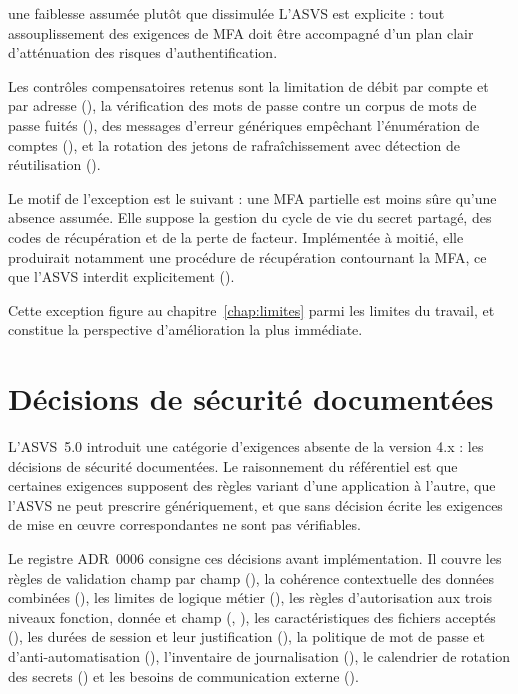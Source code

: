 \begin{constat}{une faiblesse assumée plutôt que dissimulée}
L'ASVS est explicite : tout assouplissement des exigences de MFA doit être
accompagné d'un plan clair d'atténuation des risques d'authentification.

Les contrôles compensatoires retenus sont la limitation de débit par compte et
par adresse (), la vérification des mots de passe contre un corpus
de mots de passe fuités (), des messages d'erreur génériques
empêchant l'énumération de comptes (), et la rotation des jetons de
rafraîchissement avec détection de réutilisation ().

Le motif de l'exception est le suivant : une MFA partielle est moins sûre qu'une
absence assumée. Elle suppose la gestion du cycle de vie du secret partagé, des
codes de récupération et de la perte de facteur. Implémentée à moitié, elle
produirait notamment une procédure de récupération contournant la MFA, ce que
l'ASVS interdit explicitement ().

Cette exception figure au chapitre~\ref{chap:limites} parmi les limites du
travail, et constitue la perspective d'amélioration la plus immédiate.
\end{constat}

\section{Décisions de sécurité documentées}

L'ASVS~5.0 introduit une catégorie d'exigences absente de la version 4.x : les
décisions de sécurité documentées. Le raisonnement du référentiel est que
certaines exigences supposent des règles variant d'une application à l'autre,
que l'ASVS ne peut prescrire génériquement, et que sans décision écrite les
exigences de mise en œuvre correspondantes ne sont pas vérifiables.

Le registre ADR~0006 consigne ces décisions avant implémentation. Il couvre les
règles de validation champ par champ (), la cohérence contextuelle
des données combinées (), les limites de logique métier
(), les règles d'autorisation aux trois niveaux fonction, donnée et
champ (, ), les caractéristiques des fichiers acceptés
(), les durées de session et leur justification (), la
politique de mot de passe et d'anti-automatisation (), l'inventaire
de journalisation (), le calendrier de rotation des secrets
() et les besoins de communication externe ().

